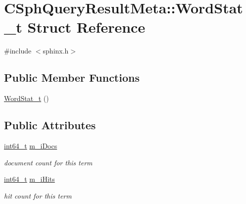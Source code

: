\hypertarget{structCSphQueryResultMeta_1_1WordStat__t}{\section{C\-Sph\-Query\-Result\-Meta\-:\-:Word\-Stat\-\_\-t Struct Reference}
\label{structCSphQueryResultMeta_1_1WordStat__t}
}


{\ttfamily \#include $<$sphinx.\-h$>$}

\subsection*{Public Member Functions}
\begin{DoxyCompactItemize}
\item 
\hyperlink{structCSphQueryResultMeta_1_1WordStat__t_a3025cf1d9862d815d636af83b40e0de2}{Word\-Stat\-\_\-t} ()
\end{DoxyCompactItemize}
\subsection*{Public Attributes}
\begin{DoxyCompactItemize}
\item 
\hyperlink{sphinxstd_8h_a996e72f71b11a5bb8b3b7b6936b1516d}{int64\-\_\-t} \hyperlink{structCSphQueryResultMeta_1_1WordStat__t_ac26917aa60bd3b7ce52ad8e0f53df66d}{m\-\_\-i\-Docs}
\begin{DoxyCompactList}\small\item\em document count for this term \end{DoxyCompactList}\item 
\hyperlink{sphinxstd_8h_a996e72f71b11a5bb8b3b7b6936b1516d}{int64\-\_\-t} \hyperlink{structCSphQueryResultMeta_1_1WordStat__t_a6c6d24a3c2eceb0f1831ee88145b710b}{m\-\_\-i\-Hits}
\begin{DoxyCompactList}\small\item\em hit count for this term \end{DoxyCompactList}\end{DoxyCompactItemize}


